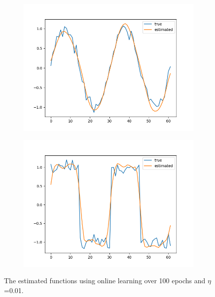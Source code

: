 \documentclass[a4paper]{article}
\begin{document}
\begin{figure}[ht]
   \begin{subfigure}[b]{0.5\textwidth}
   \centering
   \includegraphics[width=\linewidth]{figures/sineonline.png}
   \end{subfigure}
  \begin{subfigure}[b]{0.5\textwidth}
   \centering
   \includegraphics[width=\linewidth]{figures/squareonline.png}
   \end{subfigure}
   \caption{The estimated functions using online learning over 100 epochs and $\eta$=0.01.}
\end{figure}
\end{document}
